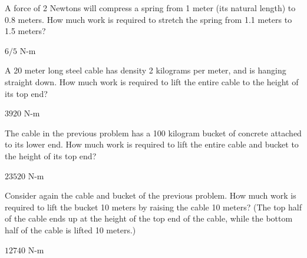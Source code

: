 \begin{exercises}
\begin{exercise} A force of 2 Newtons will compress a spring from 1 meter
(its natural length) to
0.8 meters. How much work is required to stretch the spring from 
1.1 meters to 1.5 meters?
\begin{answer} $6/5$ N-m
\end{answer}\end{exercise}

\begin{exercise} A 20 meter long steel cable has density 2 kilograms per
meter, and is hanging straight down. How much work is required to lift
the entire cable to the height of its top end?
\begin{answer} $3920$ N-m
\end{answer}\end{exercise}

\begin{exercise} The cable in the previous problem has a 100 kilogram bucket
of concrete attached to its lower end. How much work is required to lift
the entire cable and bucket to the height of its top end?
\begin{answer} $23520$ N-m
\end{answer}\end{exercise}

\begin{exercise} Consider again the cable and bucket of the previous problem.
How much work is required to lift the bucket 10 meters by raising the
cable 10 meters? (The top half of the cable ends up at the height of
the top end of the cable, while the bottom half of the cable is lifted
10 meters.)
\begin{answer} $12740$ N-m
\end{answer}\end{exercise}

\end{exercises}

